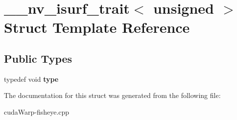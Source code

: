 \hypertarget{struct____nv__isurf__trait_3_01unsigned_01_4}{}\section{\+\_\+\+\_\+nv\+\_\+isurf\+\_\+trait$<$ unsigned $>$ Struct Template Reference}
\label{struct____nv__isurf__trait_3_01unsigned_01_4}
\subsection*{Public Types}
\begin{DoxyCompactItemize}
\item 
typedef void {\bfseries type}\hypertarget{struct____nv__isurf__trait_3_01unsigned_01_4_a5d25bc6c2e3a92989792ddf296e677e0}{}\label{struct____nv__isurf__trait_3_01unsigned_01_4_a5d25bc6c2e3a92989792ddf296e677e0}

\end{DoxyCompactItemize}


The documentation for this struct was generated from the following file\+:\begin{DoxyCompactItemize}
\item 
cuda\+Warp-\/fisheye.\+cpp\end{DoxyCompactItemize}
